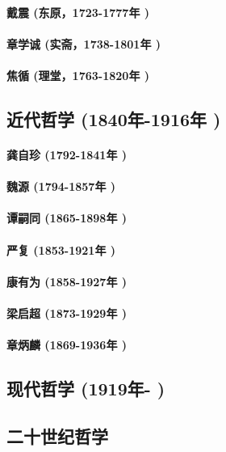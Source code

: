 \documentclass[UTF8]{../RepresentationUniverse}
\begin{document}
        \paragraph{戴震 (东原，1723-1777年 )}
        \paragraph{章学诚 (实斋，1738-1801年 )}
        \paragraph{焦循 (理堂，1763-1820年 )}
    
\subsection{近代哲学 (1840年-1916年 )}
    \paragraph{龚自珍 (1792-1841年 )}
    \paragraph{魏源 (1794-1857年 )}
    \paragraph{谭嗣同 (1865-1898年 )}
    \paragraph{严复 (1853-1921年 )}
    \paragraph{康有为 (1858-1927年 )}
    \paragraph{梁启超 (1873-1929年 )}
    \paragraph{章炳麟 (1869-1936年 )}

\subsection{现代哲学 (1919年- )}
\subsection{二十世纪哲学}
\end{document}
